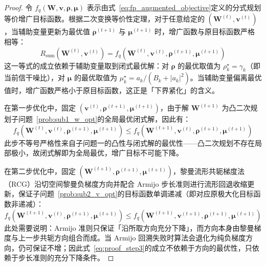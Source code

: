 \begin{proof}
  令 $f_q(\bm{W}, \bm{v}, \bm{\rho}, \bm{\mu})$ 表示由式~\eqref{eq:fp_augmented_objective}定义的分式规划等价增广目标函数。根据二次变换等价性定理，对于任意给定的 $(\bm{W}^{(t)}, \bm{v}^{(t)})$，当辅助变量更新为最优值 $\bm{\rho}^{(t+1)}$ 与 $\bm{\mu}^{(t+1)}$ 时，增广函数与原目标函数严格相等：
  \begin{equation}
    R_{\mathrm{sum}}(\bm{W}^{(t)}, \bm{v}^{(t)}) = f_q\left( \bm{W}^{(t)}, \bm{v}^{(t)}, \bm{\rho}^{(t+1)}, \bm{\mu}^{(t+1)} \right)
    \label{eq:proof_step1}
  \end{equation}
  这一等式的成立依赖于辅助变量取到闭式最优解：对 $\bm{\rho}$ 的最优取值为 $\rho_k^{\star} = \gamma_k$（即当前信干噪比），对 $\bm{\mu}$ 的最优取值为 $\mu_k^{\star} = a_k/(B_k + |a_k|^2)$。当辅助变量偏离最优值时，增广函数严格小于原目标函数，这正是「下界紧化」的含义。

  在第一步优化中，固定 $(\bm{v}^{(t)}, \bm{\rho}^{(t+1)}, \bm{\mu}^{(t+1)})$，由于解 $\bm{W}^{(t+1)}$ 为凸二次规划子问题~\eqref{prob:sub1_w_opt}的全局最优闭式解，因此有：
  \begin{equation}
    f_q\left( \bm{W}^{(t)}, \bm{v}^{(t)}, \bm{\rho}^{(t+1)}, \bm{\mu}^{(t+1)} \right) \le f_q\left( \bm{W}^{(t+1)}, \bm{v}^{(t)}, \bm{\rho}^{(t+1)}, \bm{\mu}^{(t+1)} \right)
    \label{eq:proof_step2}
  \end{equation}
  此步不等号严格性来自子问题一的凸性与闭式解的最优性——凸二次规划不存在局部极小，故闭式解即为全局最优，增广目标不可能下降。

  在第二步优化中，固定 $(\bm{W}^{(t+1)}, \bm{\rho}^{(t+1)}, \bm{\mu}^{(t+1)})$，黎曼流形共轭梯度法（RCG）沿切空间黎曼负梯度方向并配合 Armijo 步长准则进行流形回退收缩更新，保证子问题~\eqref{prob:sub2_v_opt}的目标函数单调递减（即对应原极大化目标函数非递减）：
  \begin{equation}
    f_q\left( \bm{W}^{(t+1)}, \bm{v}^{(t)}, \bm{\rho}^{(t+1)}, \bm{\mu}^{(t+1)} \right) \le f_q\left( \bm{W}^{(t+1)}, \bm{v}^{(t+1)}, \bm{\rho}^{(t+1)}, \bm{\mu}^{(t+1)} \right)
    \label{eq:proof_step3}
  \end{equation}
  此处需要说明：Armijo 准则只保证「沿所取方向充分下降」，而方向本身由黎曼梯度与上一步共轭方向组合而成。当 Armijo 回溯失败时算法会退化为纯负梯度方向，仍可保证不增；因此式~\eqref{eq:proof_step3}的成立不依赖于方向的最优性，只依赖于步长准则的充分下降条件。


\end{proof}
